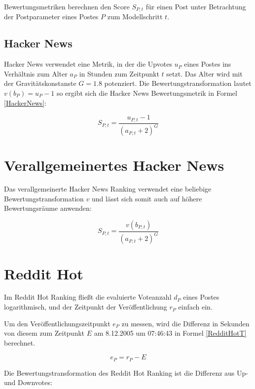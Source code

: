 Bewertungsmetriken berechnen den Score $S_{P,t}$ für einen Post unter Betrachtung der Postparameter eines Postes $P$ zum Modellschritt $t$.
	
\subsection{Hacker News}
\label{seqHackerNews}

Hacker News verwendet eine Metrik, in der die Upvotes $u_{P}$ eines Postes ins Verhältnis zum Alter $a_{P}$ in Stunden zum Zeitpunkt $t$ setzt. Das Alter wird mit der Gravitätskonstanste $G = 1.8$ potenziert. Die Bewertungstransformation lautet $v(b_P) = u_P - 1$ so ergibt sich die Hacker News Bewertungsmetrik in Formel \ref{HackerNews}:
 
\begin{equation}
\label{HackerNews}
S_{P,t} = \frac{u_{P,t} - 1}{(a_{P,t} + 2)^{G}}
\end{equation}

\section{Verallgemeinertes Hacker News}
\label{seqvHackerNews}
Das verallgemeinerte Hacker News Ranking verwendet eine beliebige Bewertungstransformation $v$ und lässt sich somit auch auf höhere Bewertungsräume anwenden:

\begin{equation}
\label{vHackerNews}
S_{P,t} = \frac{v(b_{P,t})}{(a_{P,t} + 2)^{G}}
\end{equation}


\section{Reddit Hot}

Im Reddit Hot Ranking fließt die evaluierte Voteanzahl $d_P$ eines Postes logarithmisch, und der Zeitpunkt der Veröffentlichung $r_P$ einfach ein. 

Um den Veröffentlichungszeitpunkt $e_P$ zu messen, wird die Differenz in Sekunden von diesem zum Zeitpunkt $E$ am 8.12.2005 um 07:46:43 in Formel \ref{RedditHotT} berechnet.

\begin{equation}
\label{RedditHotT}
e_{P} = r_{P} - E  
\end{equation}

Die Bewertungstransformation des Reddit Hot Ranking ist die Differenz aus Up- und Downvotes:

